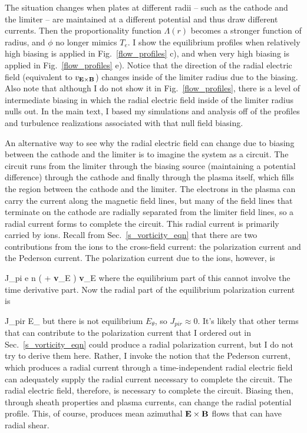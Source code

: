 The situation changes when plates at different radii -- such as the cathode and the limiter -- are maintained at a different
potential and thus draw different currents. Then the proportionality function $\Lambda(r)$ becomes a stronger function of radius, and $\phi$ no longer mimics $T_e$. 
I show the equilibrium profiles when relatively
high biasing is applied in Fig.~\ref{flow_profiles} c), and when very high biasing is applied in Fig.~\ref{flow_profiles} e). Notice that the direction of the radial electric field (equivalent
to $v_{\bf E \times B}$) changes inside of the limiter radius due to the biasing. Also note that although I do not show it in Fig.~\ref{flow_profiles}, there is a level of intermediate
biasing in which the radial electric field inside of the limiter radius nulls out. In the main text, I based my simulations and analysis off of 
the profiles and turbulence realizations associated with that null field biasing.

An alternative way to see why the radial electric field can change due to biasing between the cathode and the limiter is to imagine the system as a circuit. The circuit runs from the limiter
through the biasing source (maintaining a potential difference) through the cathode and finally through the plasma itself, which fills the region between the cathode and the limiter.
The electrons in the plasma can carry the current along the magnetic field lines, but many of the field lines that terminate on the cathode are radially separated from the limiter field lines,
so a radial current forms to complete the circuit. This radial current is primarily carried by ions. Recall from Sec.~\ref{s_vorticity_eqn} that there are two contributions from the ions
to the cross-field current: the polarization current and the Pederson current. The polarization current due to the ions, however, is

\beq
\label{pol_curr}
J_{pi} \approx e n  \times \left( \pdt + {\bf v}_E \cdot \grad \right) {\bf v}_E
\eeq
where the equilibrium part of this cannot involve the time derivative part. Now the radial part of the equilibrium polarization current is

\beq
\label{rad_pol_curr}
J_{pir} \approx {} E_\theta {}
\eeq
but there is not equilibrium $E_\theta$, so $J_{pir} \approx 0$. It's likely that other terms that can contribute to the polarization current that I ordered out in Sec.~\ref{s_vorticity_eqn}
could produce a radial polarization current, but I do not try to derive them here. Rather, I invoke the notion that the Pederson current,
which produces a radial current through a time-independent radial electric field can adequately supply the radial current necessary to complete the circuit. The radial electric field, therefore, is
necessary to complete the circuit. Biasing then, through sheath properties and plasma currents, can change the radial potential profile.
This, of course, produces mean azimuthal ${\bf E \times B}$ flows that can have radial shear.

